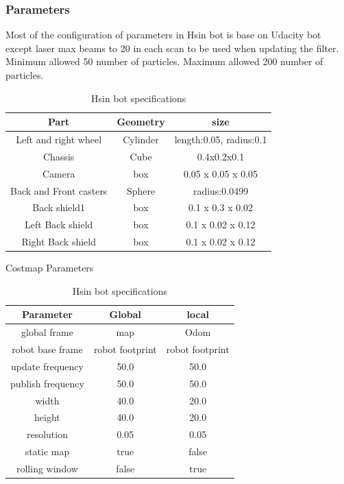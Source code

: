 \documentclass[10pt,journal,compsoc]{IEEEtran}
\begin{document}
\subsubsection{Parameters}
Most of the configuration of parameters in Hsin bot is base on Udacity bot except laser max beams to 20 in each scan to be used when updating the filter. Minimum allowed 50 number of particles. Maximum allowed 200 number of particles.
\begin{table}[h]
 \begin{center}
      \begin{tabular}{ |c|c|c| } 
       \hline
       Part & Geometry & size \\
       \hline
       Left and right wheel & Cylinder & length:0.05, radius:0.1 \\
       Chassis & Cube & 0.4x0.2x0.1  \\ 
       Camera & box & 0.05 x 0.05 x 0.05 \\
       Back and Front casters & Sphere & radius:0.0499 \\
       Back shield1 & box & 0.1 x 0.3 x 0.02 \\
       Left Back shield & box & 0.1 x 0.02 x 0.12 \\
       Right Back shield & box & 0.1 x 0.02 x 0.12 \\
       \hline
      \end{tabular}
      \caption{Hsin bot specifications}
      \label{table:1}
      \end{center}
      \end{table}
\begin{table}[h]
 \begin{center}
       Costmap Parameters \\
       \hline
      \begin{tabular}{ |c|c|c| } 
       Parameter & Global & local \\
       \hline
       global frame & map & Odom \\
       robot base frame & robot footprint & robot footprint  \\ 
       update frequency & 50.0 & 50.0 \\
       publish frequency & 50.0 & 50.0\\
       width & 40.0 & 20.0\\
       height & 40.0 & 20.0 \\
       resolution & 0.05  & 0.05 \\
       static map & true & false \\
       rolling window & false & true\\
       \hline
      \end{tabular}
      \caption{Hsin bot specifications}
      \label{table:1}
      \end{center}
      \end{table}
\end{document}
